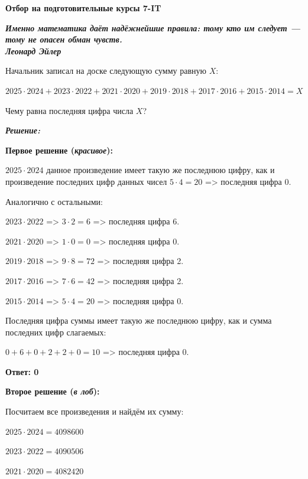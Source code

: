 \centerline{\bf \Huge Отбор на подготовительные курсы 7-IT}

\begin{flushright}
        \scriptsize{\textbf{\textit{Именно математика даёт надёжнейшие правила: тому кто им следует — тому не опасен обман чувств. \\Леонард Эйлер}}}
\end{flushright}

\hspace{3mm}

 Начальник записал на доске следующую сумму равную $X$: 

$2025\cdot2024 + 2023\cdot2022 + 2021\cdot2020 + 2019\cdot2018 + 2017\cdot2016 + 2015\cdot2014= X$

Чему равна последняя цифра числа $X$?

\hspace{3mm}

\centerline{\textbf{\textit{Решение:}}}

\textbf{Первое решение (\textit{красивое}):}

$2025\cdot2024$ данное произведение имеет такую же последнюю цифру, как и произведение последних цифр данных чисел $5\cdot4=20$ => последняя цифра 0.

Аналогично с остальными:

$2023\cdot2022$ => $3\cdot2=6$ => последняя цифра 6.

$2021\cdot2020$ => $1\cdot0=0$ => последняя цифра 0.

$2019\cdot2018$ => $9\cdot8=72$ => последняя цифра 2.

$2017\cdot2016$ => $7\cdot6=42$ => последняя цифра 2.

$2015\cdot2014$ => $5\cdot4=20$ => последняя цифра 0.

Последняя цифра суммы имеет такую же последнюю цифру, как и сумма последних цифр слагаемых:

$0+6+0+2+2+0=10$ => последняя цифра 0.

\textbf{Ответ: 0}

\newpage
\hspace{3mm}

\textbf{Второе решение (\textit{в лоб}):}

Посчитаем все произведения и найдём их сумму:

$2025\cdot2024=4098600$

$2023\cdot2022=4090506$

$2021\cdot2020=4082420$

